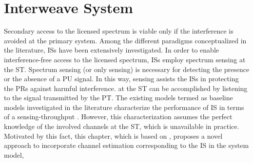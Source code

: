 \chapter{Interweave System}
\label{chap:IS}
Secondary access to the licensed spectrum is viable only if the interference is avoided at the primary system. %
Among the different paradigms conceptualized in the literature, ISs have been extensively investigated. %
In order to enable interference-free access to the licensed spectrum, ISs employ spectrum sensing at the ST. 
Spectrum sensing (or only sensing) is necessary for detecting the presence or the absence of a PU signal. In this way, sensing assists the ISs in protecting the PRs against harmful interference.  at the ST can be accomplished by listening to the signal transmitted by the PT.
The existing models termed as baseline models investigated in the literature \cite{Liang08, Sharma14, Pradhan15} characterize the performance of IS in terms of a sensing-throughput . However, this characterization assumes the perfect knowledge of the involved channels at the ST, which is unavailable in practice. 
Motivated by this fact, this chapter, which is based on , proposes a novel approach to incorporate channel estimation corresponding to the IS in the system model, %
